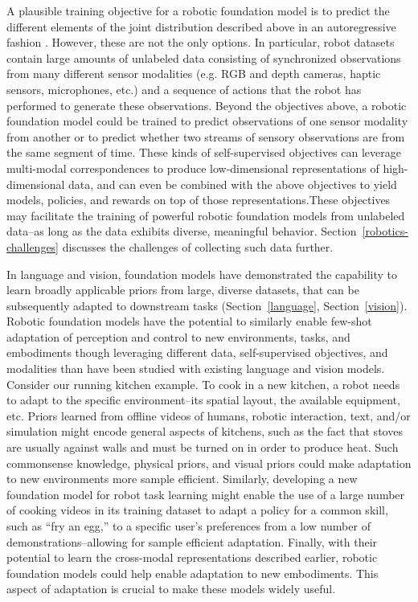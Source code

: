 A plausible training objective for a robotic foundation model is to predict the different elements of the joint distribution described above in an autoregressive fashion \citep[][Section~\ref{modeling}]{Janner2021ReinforcementLA, Chen2021DecisionTR}. However, these are not the only options. In particular, robot datasets contain large amounts of unlabeled data consisting of synchronized observations from many different sensor modalities (e.g. RGB and depth cameras, haptic sensors, microphones, etc.) and a sequence of actions that the robot has performed to generate these observations. Beyond the objectives above, a robotic foundation model could be trained to predict observations of one sensor modality from another or to predict whether two streams of sensory observations are from the same segment of time. These kinds of self-supervised objectives can leverage multi-modal correspondences to produce low-dimensional representations of high-dimensional data, and can even be combined with the above objectives to yield models, policies, and rewards on top of those representations.These objectives may facilitate the training of powerful robotic foundation models from unlabeled data--as long as the data exhibits diverse, meaningful behavior. Section~\ref{robotics-challenges} discusses the challenges of collecting such data further.

In language and vision, foundation models have demonstrated the capability to learn broadly applicable priors from large, diverse datasets, that can be subsequently adapted to downstream tasks (Section~\ref{language}, Section~\ref{vision}). Robotic foundation models have the potential to similarly enable few-shot adaptation of perception and control to new environments, tasks, and embodiments though leveraging different data, self-supervised objectives, and modalities than have been studied with existing language and vision models. Consider our running kitchen example. To cook in a new kitchen, a robot needs to adapt to the specific environment--its spatial layout, the available equipment, etc. Priors learned from offline videos of humans, robotic interaction, text, and/or simulation might encode general aspects of kitchens, such as the fact that stoves are usually against walls and must be turned on in order to produce heat. Such commonsense knowledge, physical priors, and visual priors could make adaptation to new environments more sample efficient. Similarly, developing a new foundation model for robot task learning might enable the use of a large number of cooking videos in its training dataset to adapt a policy for a common skill, such as ``fry an egg,'' to a specific user’s preferences from a low number of demonstrations--allowing for sample efficient adaptation. Finally, with their potential to learn the cross-modal representations described earlier, robotic foundation models could help enable adaptation to new embodiments. This aspect of adaptation is crucial to make these models widely useful.

